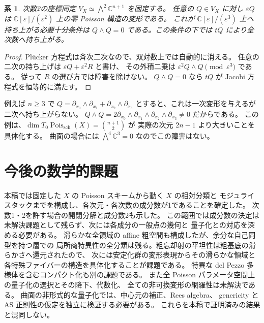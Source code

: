\documentclass[a4paper,11pt]{ltjsarticle}
\numberwithin{equation}{section}
\theoremstyle{plain}
\newtheorem{corollary}[theorem]{系}
\theoremstyle{definition}
\newcommand{\C}{\mathbb C}
\newcommand{\Pois}{\operatorname{Pois}}
\begin{document}
\begin{corollary}
\label{cor:second-order}
次数2の座標同定 $V_X\simeq\bigwedge^2\C^{n+1}$ を固定する。
任意の $Q\in V_X$ に対し $\varepsilon Q$ は
$\C[\varepsilon]/(\varepsilon^2)$ 上の零 Poisson 構造の変形である。
これが $\C[\varepsilon]/(\varepsilon^3)$ 上へ持ち上がる必要十分条件は
$Q\wedge Q=0$ である。この条件の下では $tQ$ により全次数へ持ち上がる。
\end{corollary}
\begin{proof}
Pl\"ucker 方程式は斉次二次なので、双対数上では自動的に消える。
任意の二次の持ち上げは $\varepsilon Q+\varepsilon^2R$ と書け、
その外積二乗は $\varepsilon^2Q\wedge Q\pmod{\varepsilon^3}$ である。
従って $R$ の選び方では障害を除けない。
$Q\wedge Q=0$ なら $tQ$ が Jacobi 方程式を恒等的に満たす。
\end{proof}

例えば $n\geq3$ で
$Q=\partial_{x_0}\wedge\partial_{x_1}+\partial_{x_2}\wedge\partial_{x_3}$
とすると、これは一次変形を与えるが二次へ持ち上がらない。
$Q\wedge Q=2\partial_{x_0}\wedge\partial_{x_1}\wedge
\partial_{x_2}\wedge\partial_{x_3}\neq0$ だからである。
この例は、$\dim T_0\Pois_{\mathrm{sch}}(X)=\binom{n+1}{2}$ が
実際の次元 $2n-1$ より大きいことを具体化する。
曲面の場合には $\bigwedge^4\C^3=0$ なのでこの障害はない。



\section{今後の数学的課題}
\label{sec:open}
本稿では固定した $X$ の Poisson スキームから動く $X$ の相対分類と
モジュライスタックまでを構成し、各次元・各次数の成分数が1であることを確定した。
次数1・2を許す場合の開閉分解と成分数2も示した。
この範囲では成分数の決定は未解決課題として残らず、次には各成分の一般点の幾何と
量子化との対応を深める必要がある。
滑らかな全領域の affine 粗空間も構成したが、余分な自己同型を持つ層での
局所商特異性の全分類は残る。粗忘却射の平坦性は粗基底の滑らかさへ還元されたので、
次には安定化群の変形表現からその滑らかな領域と各特殊ファイバーの構造を具体化することが課題である。
特異な del Pezzo 多様体を含むコンパクト化も別の課題である。
また全 Poisson パラメータ空間上の量子化の選択とその降下、代数化、
全ての非可換変形の網羅性は未解決である。
曲面の非形式的な量子化では、中心元の補正、Rees algebra、
genericity と AS 正則性の仮定を独立に検証する必要がある。
これらを本稿で証明済みの結果と混同しない。

\begingroup
\small


\endgroup
\end{document}
